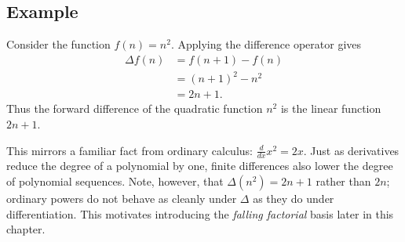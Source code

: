 \subsection*{Example}

Consider the function \(f(n) = n^2\). Applying the difference operator gives
\[
\begin{aligned}
\Delta f(n)
&= f(n+1) - f(n) \\
&= (n+1)^2 - n^2 \\
&= 2n + 1.
\end{aligned}
\]
Thus the forward difference of the quadratic function \(n^2\) is the linear
function \(2n+1\).

\begin{remark*}
This mirrors a familiar fact from ordinary calculus: \(\tfrac{d}{dx} x^2 = 2x\).
Just as derivatives reduce the degree of a polynomial by one,
finite differences also lower the degree of polynomial sequences.
Note, however, that \(\Delta(n^2) = 2n+1\) rather than \(2n\); ordinary
powers do not behave as cleanly under \(\Delta\) as they do under
differentiation. This motivates introducing the \emph{falling factorial}
basis later in this chapter.
\end{remark*}
